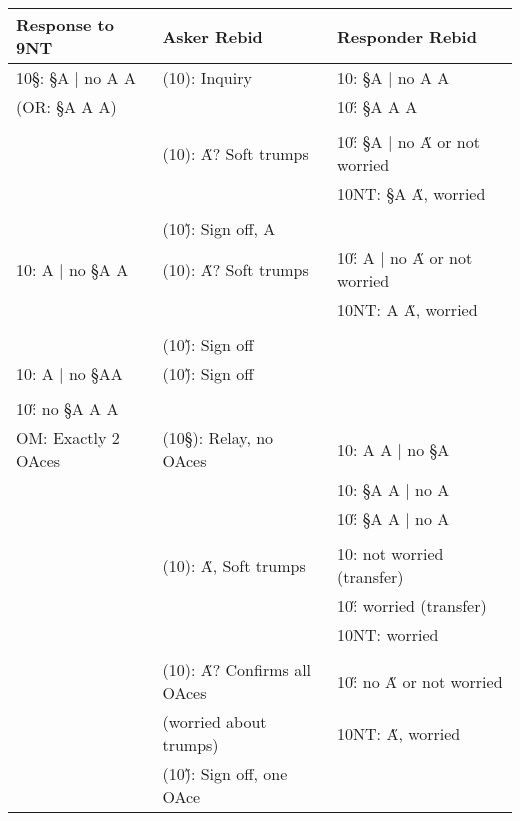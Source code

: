 \documentclass[a4paper]{JoshCards}
\begin{document}
\newpage
\begin{table}[h!]
    \begin{center}
      \label{tab:table1}
      \begin{tabular}{|l|l|l|}
        \hline
        \textbf{Response to 9NT} & \textbf{Asker Rebid} & \textbf{Responder Rebid}\\
        \hline
        10\S: \S A $\mid$ no \C A \D A & (10\C): Inquiry  
        & 10\D: \S A $\mid$ no \C A \D A\\
        \qquad (OR: \S A \C A \D A)
        && 10\H: \S A \C A \D A\\
        &&\\
        & (10\D): \H A? Soft trumps & 10\H: \S A $\mid$ no \H A or not worried\\
        && 10NT: \S A \H A, worried\\
        &&\\
        & (10\H): Sign off, \D A&\\
        \hline
        10\C: \C A $\mid$ no \S A \D A& (10\D): \H A? Soft trumps
        & 10\H: \C A $\mid$ no \H A or not worried\\
        && 10NT: \C A \H A, worried\\
        &&\\
        & (10\H): Sign off&\\
        \hline
        10\D:  \D A $\mid$ no \S A\C A & (10\H): Sign off &\\
        &&\\
        10\H: no \S A \C A \D A && \\
        \hline
        OM: Exactly 2 OAces & (10\S): Relay, no OAces   
        & 10\C: \C A \D A $\mid$ no \S A\\
        && 10\D: \S A \D A $\mid$ no \C A\\
        && 10\H: \S A \C A $\mid$ no \D A\\
        &&\\
        & (10\C): \H A, Soft trumps & 10\D: not worried (transfer)\\
        && 10\H: worried (transfer)\\
        && 10NT: worried\\
        &&\\
        &(10\D): \H A? Confirms all OAces & 10\H: no \H A or not worried\\
        & \qquad \qquad \quad (worried about trumps) & 10NT: \H A, worried\\
        &(10\H): Sign off, one OAce&\\

\end{tabular}
\end{center}
\end{table}
\end{document}
